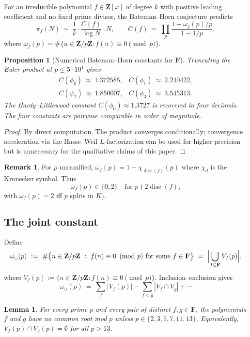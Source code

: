 \documentclass[11pt]{article}
\newtheorem{lemma}[theorem]{Lemma}
\newtheorem{proposition}[theorem]{Proposition}
\theoremstyle{definition}
\newtheorem{remark}[theorem]{Remark}
\newcommand{\Z}{\mathbf{Z}}
\newcommand{\F}{\mathbf{F}}
\newcommand{\F}{\mathcal{F}}
\DeclareMathOperator{\disc}{disc}
\begin{document}
For an irreducible polynomial $f\in\Z[x]$ of degree $k$ with positive leading coefficient and no fixed prime divisor, the Bateman--Horn conjecture \cite{batemanhorn} predicts
\[
\pi_f(N)\ \sim\ \frac{1}{k}\cdot\frac{C(f)}{\log N}\cdot N,\qquad
C(f)\ =\ \prod_p \frac{1-\omega_f(p)/p}{1-1/p},
\]
where $\omega_f(p)=\#\{n\in\Z/p\Z : f(n)\equiv 0\pmod p\}$.

\begin{proposition}[Numerical Bateman--Horn constants for $\F$]\label{prop:bhvals}
Truncating the Euler product at $p\le 5\cdot 10^4$ gives
\[
\begin{array}{ll}
C(\phi_0)\ \approx\ 1.372585, & C(\phi_1)\ \approx\ 2.240422,\\
C(\psi_2)\ \approx\ 1.850007, & C(\phi_3)\ \approx\ 3.545313.
\end{array}
\]
The Hardy--Littlewood constant $C(\phi_0)\approx 1.3727$ \cite{hardylittlewood} is recovered to four decimals. The four constants are pairwise comparable in order of magnitude.
\end{proposition}

\begin{proof}
By direct computation. The product converges conditionally; convergence acceleration via the Hasse--Weil $L$-factorization can be used for higher precision but is unnecessary for the qualitative claims of this paper.
\end{proof}

\begin{remark}\label{rem:omegapatterns}
For $p$ unramified, $\omega_f(p)=1+\chi_{\disc(f)}(p)$ where $\chi_d$ is the Kronecker symbol. Thus
\[
\omega_f(p)\in\{0,2\}\quad\text{for }p\nmid 2\disc(f),
\]
with $\omega_f(p)=2$ iff $p$ splits in $K_f$.
\end{remark}

\subsection{The joint constant}

Define
\[
\omega_\cup(p)\ :=\ \#\bigl\{n\in\Z/p\Z\ :\ f(n)\equiv 0\pmod p\text{ for some }f\in\F\bigr\}\ =\ \Bigl|\bigcup_{f\in\F}V_f(p)\Bigr|,
\]
where $V_f(p):=\{n\in\Z/p\Z : f(n)\equiv 0\pmod p\}$. Inclusion--exclusion gives
\[
\omega_\cup(p)\ =\ \sum_{f}|V_f(p)|-\sum_{f<g}|V_f\cap V_g|+\cdots
\]
\begin{lemma}\label{lem:vfvg-empty}
For every prime $p$ and every pair of distinct $f,g\in\F$, the polynomials $f$ and $g$ have no common root mod $p$ unless $p\in\{2,3,5,7,11,13\}$. Equivalently, $V_f(p)\cap V_g(p)=\emptyset$ for all $p>13$.
\end{lemma}
\end{document}
